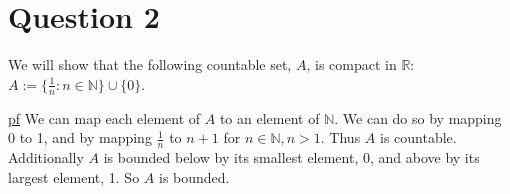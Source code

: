 \documentclass[11pt]{article} %
\begin{document}
%


\section{Question 2}
We will show that the following countable set, $A$, is compact in $\mathbb{R}$: $A:= \{ \frac{1}{n}: n \in \mathbb{N}\} \cup \{ 0 \}$.

\underline{pf} We can map each element of $A$ to an element of $\mathbb{N}$. We can do so by mapping 0 to 1, and by mapping $\frac{1}{n}$ to $n+1$ for $n \in \mathbb{N}, n>1.$ Thus $A$ is countable. Additionally $A$ is bounded below by its smallest element, 0, and above by its largest element, 1. So $A$ is bounded.
\end{document}
